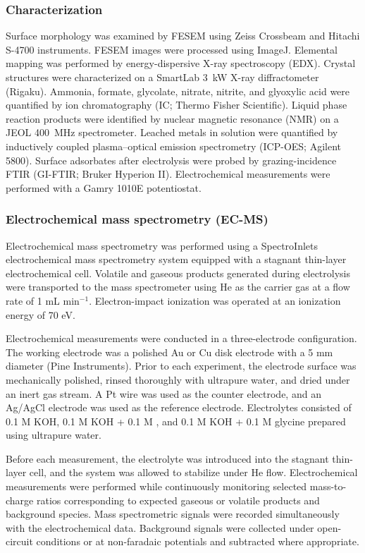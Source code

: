 \documentclass[twoside,twocolumn,9pt]{article}
\begin{document}
\subsubsection{Characterization}
Surface morphology was examined by FESEM using Zeiss Crossbeam and Hitachi S-4700 instruments. FESEM images were processed using ImageJ. Elemental mapping was performed by energy-dispersive X-ray spectroscopy (EDX). Crystal structures were characterized on a SmartLab 3~kW X-ray diffractometer (Rigaku). Ammonia, formate, glycolate, nitrate, nitrite, and glyoxylic acid were quantified by ion chromatography (IC; Thermo Fisher Scientific). Liquid phase reaction products were identified by nuclear magnetic resonance (NMR) on a JEOL 400~MHz spectrometer. Leached metals in solution were quantified by inductively coupled plasma–optical emission spectrometry (ICP-OES; Agilent 5800). Surface adsorbates after electrolysis were probed by grazing-incidence FTIR (GI-FTIR; Bruker Hyperion II). Electrochemical measurements were performed with a Gamry 1010E potentiostat.

\subsubsection{Electrochemical mass spectrometry (EC-MS)}
Electrochemical mass spectrometry was performed using a SpectroInlets electrochemical mass spectrometry system equipped with a stagnant thin-layer electrochemical cell. Volatile and gaseous products generated during electrolysis were transported to the mass spectrometer using He as the carrier gas at a flow rate of 1 mL min$^{-1}$. Electron-impact ionization was operated at an ionization energy of 70 eV. 

Electrochemical measurements were conducted in a three-electrode configuration. The working electrode was a polished Au or Cu disk electrode with a 5 mm diameter (Pine Instruments). Prior to each experiment, the electrode surface was mechanically polished, rinsed thoroughly with ultrapure water, and dried under an inert gas stream. A Pt wire was used as the counter electrode, and an Ag/AgCl electrode was used as the reference electrode. Electrolytes consisted of 0.1 M KOH, 0.1 M KOH + 0.1 M , and 0.1 M KOH + 0.1 M glycine prepared using ultrapure water. 

Before each measurement, the electrolyte was introduced into the stagnant thin-layer cell, and the system was allowed to stabilize under He flow. Electrochemical measurements were performed while continuously monitoring selected mass-to-charge ratios corresponding to expected gaseous or volatile products and background species. Mass spectrometric signals were recorded simultaneously with the electrochemical data. Background signals were collected under open-circuit conditions or at non-faradaic potentials and subtracted where appropriate. 
\end{document}
